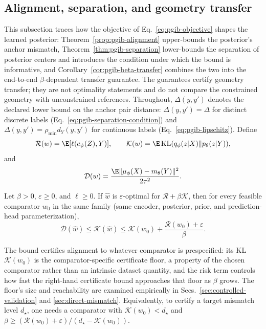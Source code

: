 \subsection{Alignment, separation, and geometry transfer}
\label{sec:guarantees}
This subsection traces how the objective of Eq.~\eqref{eq:pgib-objective} shapes
the learned posterior: Theorem~\ref{prop:pgib-alignment} upper-bounds the
posterior's anchor mismatch, Theorem~\ref{thm:pgib-separation} lower-bounds the
separation of posterior centers and introduces the condition under which the bound
is informative, and Corollary~\ref{cor:pgib-beta-transfer} combines the two into
the end-to-end $\beta$-dependent transfer guarantee. The guarantees certify
geometry transfer; they are not optimality statements and do not compare the
constrained geometry with unconstrained references. Throughout, $\Delta(y,y')$
denotes the declared lower bound on the anchor pair distance:
$\Delta(y,y')=\Delta$ for distinct discrete labels
(Eq.~\eqref{eq:pgib-separation-condition}) and
$\Delta(y,y')=\rho_{\min}d_Y(y,y')$ for continuous labels
(Eq.~\eqref{eq:pgib-lipschitz}). Define
\begin{equation}
\mathcal R(w)=\E[\ell(c_\psi(Z),Y)],\qquad
\mathcal K(w)=\E\KL(q_\phi(z|X)\|p_\theta(z|Y)),
\label{eq:risk-rate-definitions}
\end{equation}
and
\begin{equation}
\mathcal D(w)=\frac{\E\|\mu_\phi(X)-m_\theta(Y)\|^2}{2\tau^2}.
\label{eq:expected-anchor-mismatch}
\end{equation}
\begin{theorem}
\label{prop:pgib-alignment}
Let $\beta>0$, $\varepsilon\ge0$, and $\ell\ge0$. If $\widehat w$ is
$\varepsilon$-optimal for $\mathcal R+\beta\mathcal K$, then for every feasible
comparator $w_0$ in the same family (same encoder, posterior, prior, and
prediction-head parameterization),
\begin{equation}
\mathcal D(\widehat w)\le\mathcal K(\widehat w)\le
\mathcal K(w_0)+\frac{\mathcal R(w_0)+\varepsilon}{\beta}.
\label{eq:pgib-comparator-bound}
\end{equation}
\end{theorem}

The bound certifies alignment to whatever comparator is prespecified: its KL
$\mathcal K(w_0)$ is the comparator-specific certificate floor, a property of
the chosen comparator rather than an intrinsic dataset quantity, and the risk
term controls how fast the right-hand certificate bound approaches that floor
as $\beta$ grows. The floor's size and reachability are examined empirically in
Secs.~\ref{sec:controlled-validation} and \ref{sec:direct-mismatch}. Equivalently, to certify a target mismatch level $d_\star$,
one needs a comparator with $\mathcal K(w_0)<d_\star$ and
$\beta\ge(\mathcal R(w_0)+\varepsilon)/(d_\star-\mathcal K(w_0))$.

